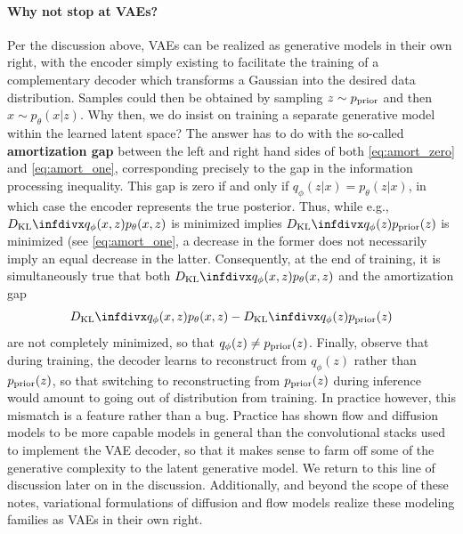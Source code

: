 \paragraph{Why not stop at VAEs?}
Per the discussion above, VAEs can be realized as generative models in their own right, with the encoder simply existing to facilitate the training of a complementary decoder which transforms a Gaussian into the desired data distribution. Samples could then be obtained by sampling $z \sim p_{\text{prior}}$ and then $x \sim p_\theta(x|z)$. Why then, we do insist on training a separate generative model within the learned latent space? The answer has to do with the so-called \textbf{amortization gap} between the left and right hand sides of both \cref{eq:amort_zero} and \cref{eq:amort_one}, corresponding precisely to the gap in the information processing inequality. This gap is zero if and only if $q_\phi(z|x)=p_\theta(z|x)$, in which case the encoder represents the true posterior. Thus, while e.g., $\dkl{q_\phi(x,z)}{p_\theta(x,z)}$ is minimized implies $\dkl{q_\phi(z)}{\prior(z)}$ is minimized (see \cref{eq:amort_one}, a decrease in the former does not necessarily imply an equal decrease in the latter. Consequently, at the end of training, it is simultaneously true that both $\dkl{q_\phi(x,z)}{p_\theta(x,z)}$ and the amortization gap  
\begin{equation}
    \dkl{q_\phi(x,z)}{p_\theta(x,z)} - \dkl{q_\phi(z)}{\prior(z)}
\end{equation}
 are not completely minimized, so that $q_\phi(z) \neq p_{\text{prior}}(z)$. Finally, observe that during training, the decoder learns to reconstruct from $q_\phi(z)$ rather than $p_{\text{prior}}(z)$, so that switching to reconstructing from $p_{\text{prior}}(z)$ during inference would amount to going out of distribution from training. In practice however, this mismatch is a feature rather than a bug. Practice has shown flow and diffusion models to be more capable models in general than the convolutional stacks used to implement the VAE decoder, so that it makes sense to farm off some of the generative complexity to the latent generative model. We return to this line of discussion later on in the discussion. Additionally, and beyond the scope of these notes, variational formulations of diffusion and flow models realize these modeling families as VAEs in their own right.
